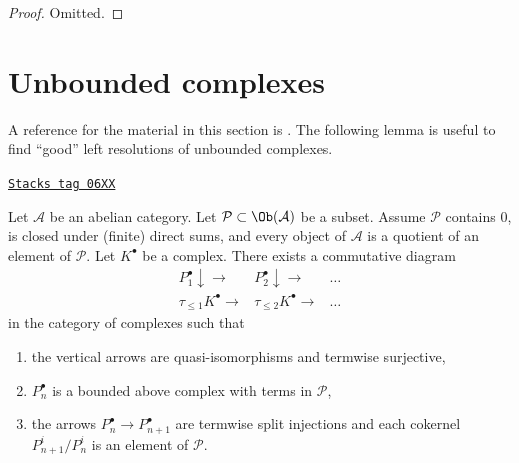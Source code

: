 \begin{proof}
Omitted.
\end{proof}

\section{Unbounded complexes}
\label{derived-section-unbounded}
A reference for the material in this section is \cite{Spaltenstein}.
The following lemma is useful to find ``good'' left resolutions of
unbounded complexes.

\begin{lemma}
\label{derived-lemma-special-direct-system}
\href{https://stacks.math.columbia.edu/tag/06XX}{\texttt{Stacks tag 06XX}}

Let $\mathcal{A}$ be an abelian category. Let
$\mathcal{P} \subset \Ob(\mathcal{A})$ be a subset.
Assume $\mathcal{P}$ contains $0$, is closed under (finite) direct sums,
and every object of $\mathcal{A}$ is a quotient of an
element of $\mathcal{P}$. Let $K^\bullet$ be a complex.
There exists a commutative diagram
$$
\begin{array}{ccc}P_1^\bullet \downarrow\longrightarrow & P_2^\bullet \downarrow\longrightarrow & \ldots \\ \tau_{\leq 1}K^\bullet \longrightarrow & \tau_{\leq 2}K^\bullet \longrightarrow & \ldots\end{array}
$$
in the category of complexes such that
\begin{enumerate}
\item the vertical arrows are quasi-isomorphisms and termwise surjective,
\item $P_n^\bullet$ is a bounded above complex with terms in
$\mathcal{P}$,
\item the arrows $P_n^\bullet \to P_{n + 1}^\bullet$
are termwise split injections and each cokernel
$P^i_{n + 1}/P^i_n$ is an element of $\mathcal{P}$.
\end{enumerate}
\end{lemma}

